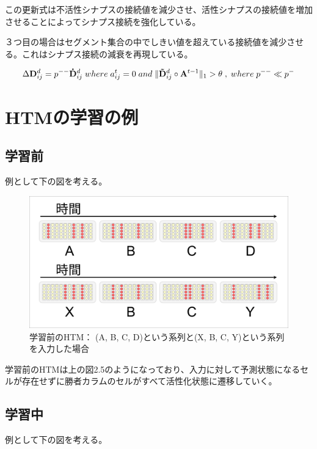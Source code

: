 この更新式は不活性シナプスの接続値を減少させ、活性シナプスの接続値を増加させることによってシナプス接続を強化している。

３つ目の場合はセグメント集合の中でしきい値を超えている接続値を減少させる。これはシナプス接続の減衰を再現している。

\begin{equation}
  \Delta {\bf D}^d_{ij} = p^{--}{\bf \dot{D}}^d_{ij} \; where \; a^t_{ij} = 0 \; and \; \|{\bf \tilde{D}}^d_{ij} \circ {\bf A}^{t-1}\|_1 > \theta \; , \; where \; p^{--} \ll p^-
\end{equation}

\section{HTMの学習の例}

\subsection{学習前}
例として下の図を考える。

\begin{figure}[ht]
  \begin{center}
    \includegraphics[width=14cm]{./fig/drawing_5}
    \caption{学習前のHTM： (A, B, C, D)という系列と(X, B, C, Y)という系列を入力した場合}
    \label{fig:HTM_before_learning}
  \end{center}
\end{figure}

学習前のHTMは上の図2.5のようになっており、入力に対して予測状態になるセルが存在せずに勝者カラムのセルがすべて活性化状態に遷移していく。

\subsection{学習中}
例として下の図を考える。

